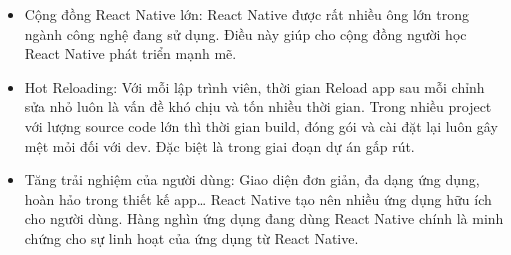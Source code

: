 \begin{enumerate}[a. ]
\begin{itemize}
React Native là bước chuyển mình lớn của mobile app. Việc lập trình trên đa dạng hệ điều hành mang đến sự tiện ích cho cộng đồng dev trên toàn cầu.
\item Cộng đồng React Native lớn:
React Native được rất nhiều ông lớn trong ngành công nghệ đang sử dụng. Điều này giúp cho cộng đồng người học React Native phát triển mạnh mẽ.
\item Hot Reloading:
Với mỗi lập trình viên, thời gian Reload app sau mỗi chỉnh sửa nhỏ luôn là vấn đề khó chịu và tốn nhiều thời gian. Trong nhiều project với lượng source code lớn thì thời gian build, đóng gói và cài đặt lại luôn gây mệt mỏi đối với dev. Đặc biệt là trong giai đoạn dự án gấp rút.
\item Tăng trải nghiệm của người dùng:
Giao diện đơn giản, đa dạng ứng dụng, hoàn hảo trong thiết kế app… React Native tạo nên nhiều ứng dụng hữu ích cho người dùng. Hàng nghìn ứng dụng đang dùng React Native chính là minh chứng cho sự linh hoạt của ứng dụng từ React Native.
\end{itemize}

\end{enumerate}
